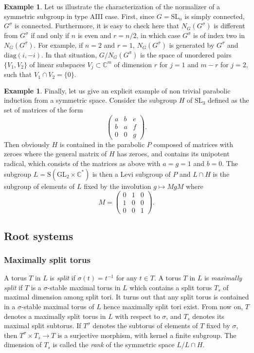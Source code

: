 \documentclass{amsart}
\theoremstyle{definition}
\newtheorem{exa}[thm]{Example}
\begin{document}
\begin{exa}
\label{exa_normalizer_AIII}
Let us illustrate the characterization of the normalizer of a symmetric subgroup 
in type AIII case. 
First, since $G=\mathrm{SL}_n$ is simply connected, $G^{\sigma}$ is connected.
Furthermore, it is easy to check here that $N_G(G^{\sigma})$ 
is different from $G^{\sigma}$ if and only if $n$ is even and $r=n/2$, 
in which case $G^{\sigma}$ is of index two in  $N_G(G^{\sigma})$.
For example, if $n=2$ and $r=1$, $N_G(G^{\sigma})$ is generated 
by $G^{\sigma}$ and $\mathrm{diag}(i,-i)$. 
In that situation, $G/N_G(G^{\sigma})$ is the space of unordered pairs 
$\{V_1,V_2\}$ of linear subspaces $V_j\subset \mathbb{C}^m$ of 
dimension $r$ for $j=1$ and $m-r$ for $j=2$, such that $V_1\cap V_2=\{0\}$.
\end{exa}

\begin{exa}
\label{exa_horosym}
Finally, let us give an explicit example of non trivial parabolic induction 
from a symmetric space. 
Consider the subgroup $H$ of $\mathrm{SL}_3$ defined as the set 
of matrices of the form 
\[
\begin{pmatrix} a & b & e \\ b & a & f \\ 0 & 0 & g \end{pmatrix}.
\] 
Then obviously $H$ is contained in the parabolic $P$ composed of 
matrices with zeroes where the general matrix of $H$ has zeroes, 
and contains its unipotent radical, which consists of the matrices 
as above with $a=g=1$ and $b=0$. The subgroup 
$L=\mathrm{S}(\mathrm{GL}_2\times \mathbb{C}^*)$ is then 
a Levi subgroup of $P$ and $L\cap H$ is the subgroup of elements 
of $L$ fixed by the involution $g\mapsto MgM$ where 
\[
M=\begin{pmatrix}0&1&0\\1&0&0\\0&0&1\end{pmatrix}.
\] 
\end{exa}

\subsection{Root systems}

\subsubsection{Maximally split torus}

A torus $T$ in $L$ is \emph{split} if $\sigma(t)=t^{-1}$ for any $t\in T$.
A torus $T$ in $L$ is \emph{maximally split} if $T$ is a 
$\sigma$-stable maximal torus in $L$ which contains a split torus   
$T_s$ of maximal dimension among split tori. 
It turns out that any split torus is contained in a $\sigma$-stable maximal
torus of $L$ \cite{Vus74} hence maximally split tori exist. 
From now on, $T$ denotes a maximally split torus in $L$ with respect to $\sigma$, 
and $T_s$ denotes its maximal split subtorus. If $T^{\sigma}$ denotes the subtorus of 
elements of $T$ fixed by $\sigma$, then $T^{\sigma}\times T_s \rightarrow T$ 
is a surjective morphism, with kernel a finite subgroup. 
The dimension of $T_s$ is called the \emph{rank} of the symmetric space $L/L\cap H$.
\end{document}
